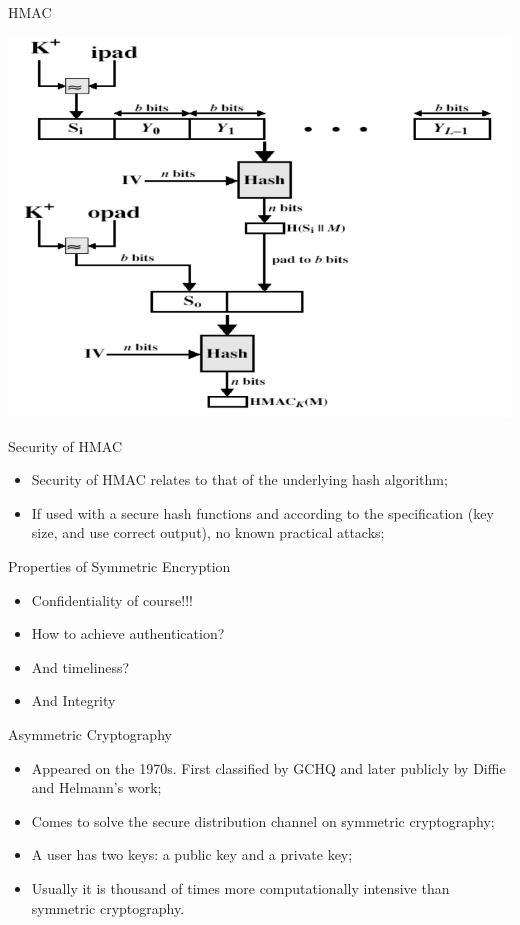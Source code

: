 \documentclass[12pt,table,xcolor={dvipsnames}]{beamer}
\begin{document}
\begin{frame}{HMAC}
\begin{center}
\includegraphics[scale=.33]{HMAC.png}
\end{center}
\end{frame}

\begin{frame}{Security of HMAC}
\begin{itemize}
\item Security of HMAC relates to that of the underlying hash algorithm;
\item If used with a secure hash functions and according to the specification (key size, and use correct output), no known practical attacks;
\end{itemize}
\end{frame}

\begin{frame}{Properties of Symmetric Encryption}
\begin{itemize}
\item Confidentiality of course!!!
\item How to achieve authentication?
\item And timeliness?
\item And Integrity
\end{itemize}
\end{frame}

\begin{frame}{Asymmetric Cryptography}
\begin{itemize}
\item Appeared on the 1970s. First classified by GCHQ and later publicly by Diffie and Helmann's work;\pause
\item Comes to solve the secure distribution channel on symmetric cryptography;\pause
\item A user has two keys: a public key and a private key;\pause 
\item Usually it is thousand of times more computationally intensive than symmetric cryptography.
\end{itemize}
\end{frame}
\end{document}
